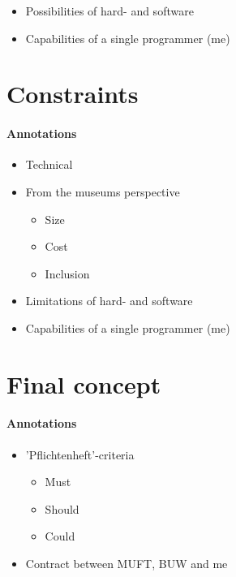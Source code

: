 \begin{itemize}
	\item Possibilities of hard- and software
	\item Capabilities of a single programmer (me)
\end{itemize}



\section{Constraints}
\label{conception_constraints}

\paragraph{Annotations}

\begin{itemize}
	\item Technical
	\item From the museums perspective
	\begin{itemize}
		\item Size
		\item Cost
		\item Inclusion
	\end{itemize}
	\item Limitations of hard- and software
	\item Capabilities of a single programmer (me)
\end{itemize}



\section{Final concept}
\label{conception_final}

\paragraph{Annotations}

\begin{itemize}
	\item 'Pflichtenheft'-criteria
	\begin{itemize}
		\item Must
		\item Should
		\item Could
	\end{itemize}
	\item Contract between MUFT, BUW and me
\end{itemize}



